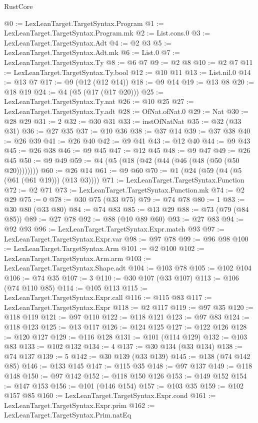 \begin{lexlean}{RustCore}
\begin{coremodule}
@0 := LexLeanTarget.TargetSyntax.Program
@1 := LexLeanTarget.TargetSyntax.Program.mk
@2 := List.cons.{0}
@3 := LexLeanTarget.TargetSyntax.Adt
@4 := @2 @3
@5 := LexLeanTarget.TargetSyntax.Adt.mk
@6 := List.{0}
@7 := LexLeanTarget.TargetSyntax.Ty
@8 := @6 @7
@9 := @2 @8
@10 := @2 @7
@11 := LexLeanTarget.TargetSyntax.Ty.bool
@12 := @10 @11
@13 := List.nil.{0}
@14 := @13 @7
@17 := @9 (@12 (@12 @14))
@18 := @9 @14
@19 := @13 @8
@20 := @18 @19
@24 := @4 (@5 (@17 (@17 @20)))
@25 := LexLeanTarget.TargetSyntax.Ty.nat
@26 := @10 @25
@27 := LexLeanTarget.TargetSyntax.Ty.adt
@28 := OfNat.ofNat.{0}
@29 := Nat
@30 := @28 @29
@31 := 2
@32 := @30 @31
@33 := instOfNatNat
@35 := @32 (@33 @31)
@36 := @27 @35
@37 := @10 @36
@38 := @37 @14
@39 := @37 @38
@40 := @26 @39
@41 := @26 @40
@42 := @9 @41
@43 := @12 @40
@44 := @9 @43
@45 := @26 @38
@46 := @9 @45
@47 := @12 @45
@48 := @9 @47
@49 := @26 @45
@50 := @9 @49
@59 := @4 (@5 (@18 (@42 (@44 (@46 (@48 (@50 (@50 @20))))))))
@60 := @26 @14
@61 := @9 @60
@70 := @1 (@24 (@59 (@4 (@5 (@61 (@61 @19))) (@13 @3))))
@71 := LexLeanTarget.TargetSyntax.Function
@72 := @2 @71
@73 := LexLeanTarget.TargetSyntax.Function.mk
@74 := @2 @29
@75 := 0
@78 := @30 @75 (@33 @75)
@79 := @74 @78
@80 := 1
@83 := @30 @80 (@33 @80)
@84 := @74 @83
@85 := @13 @29
@88 := @73 (@79 (@84 @85))
@89 := @27 @78
@92 := @88 (@10 @89 @60)
@93 := @27 @83
@94 := @92 @93
@96 := LexLeanTarget.TargetSyntax.Expr.match @93
@97 := LexLeanTarget.TargetSyntax.Expr.var
@98 := @97 @78
@99 := @96 @98
@100 := LexLeanTarget.TargetSyntax.Arm
@101 := @2 @100
@102 := LexLeanTarget.TargetSyntax.Arm.arm
@103 := LexLeanTarget.TargetSyntax.Shape.adt
@104 := @103 @78
@105 := @102 @104
@106 := @74 @35
@107 := 3
@110 := @30 @107 (@33 @107)
@113 := @106 (@74 @110 @85)
@114 := @105 @113
@115 := LexLeanTarget.TargetSyntax.Expr.call
@116 := @115 @83
@117 := LexLeanTarget.TargetSyntax.Expr
@118 := @2 @117
@119 := @97 @35
@120 := @118 @119
@121 := @97 @110
@122 := @118 @121
@123 := @97 @83
@124 := @118 @123
@125 := @13 @117
@126 := @124 @125
@127 := @122 @126
@128 := @120 @127
@129 := @116 @128
@131 := @101 (@114 @129)
@132 := @103 @83
@133 := @102 @132
@134 := 4
@137 := @30 @134 (@33 @134)
@138 := @74 @137
@139 := 5
@142 := @30 @139 (@33 @139)
@145 := @138 (@74 @142 @85)
@146 := @133 @145
@147 := @115 @35
@148 := @97 @137
@149 := @118 @148
@150 := @97 @142
@152 := @118 @150 @126
@153 := @149 @152
@154 := @147 @153
@156 := @101 (@146 @154)
@157 := @103 @35
@159 := @102 @157 @85
@160 := LexLeanTarget.TargetSyntax.Expr.cond
@161 := LexLeanTarget.TargetSyntax.Expr.prim
@162 := LexLeanTarget.TargetSyntax.Prim.natEq

\end{coremodule}
\end{lexlean}
